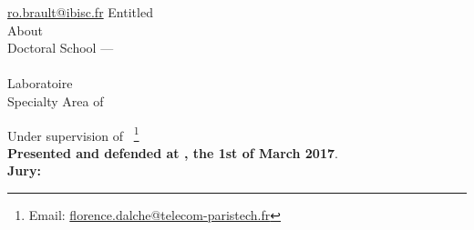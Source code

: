 \begin{titlepage}
\begin{addmargin}[-1cm]{-3cm}
\begin{center}
{                \href{mailto:ro.brault@gmail.com}{ro.brault@ibisc.fr}}
            \endgroup
            \bigskip\vfill
            \begingroup
                Entitled \\ \smallskip {\Huge \color{PSaclay}\textsc{\myTitle}}
            \endgroup
            \bigskip
            \vfill
            \begingroup
                About \\ {\Large \textbf{\textsc{\mySubtitle}}}
            \endgroup
            \bigskip
            \vfill
            \begingroup
                Doctoral School --- \EDN\\
                \myDoctoralSchool\\
                Laboratoire \myFaculty\\
                Specialty Area of \myDepartment%
                \medskip
            \endgroup
        \end{center}
        \vspace{1cm}
        \vfill
        \noindent Under supervision of
        \mySupervisorDegree~\textsc{\mySupervisor}\footnote{Email:
        \href{mailto:florence.dalche@telecom-paristech.fr}%
        {florence.dalche@telecom-paristech.fr}}\\
        \smallskip
        \noindent \textbf{Presented and defended at \myUniUEVE, the 1st of
        March 2017}. \\
        \smallskip
        \noindent \textbf{Jury:}

\end{addmargin}
\end{titlepage}
